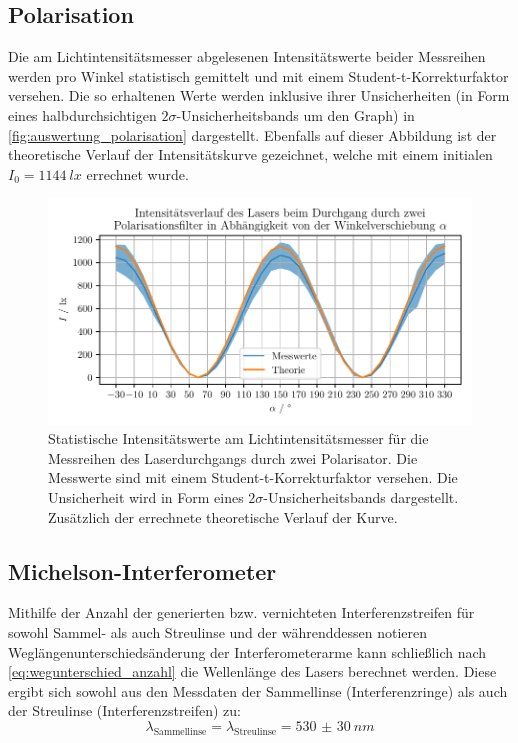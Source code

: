 \documentclass[ngerman]{scrartcl}
\begin{document}
\subsection{Polarisation}
\label{subsec:auswertung_polarisation}

Die am Lichtintensitätsmesser abgelesenen Intensitätswerte beider Messreihen werden pro Winkel statistisch gemittelt und mit einem Student-t-Korrekturfaktor versehen. Die so erhaltenen Werte werden inklusive ihrer Unsicherheiten (in Form eines halbdurchsichtigen $2 \sigma$-Unsicherheitsbands um den Graph) in \autoref{fig:auswertung_polarisation} dargestellt. Ebenfalls auf dieser Abbildung ist der theoretische Verlauf der Intensitätskurve gezeichnet, welche mit einem initialen $I_0 = \SI{1144}{lx}$ errechnet wurde.
%
\begin{figure}[H]
    \centering
    \begin{samepage}
        \includegraphics[width=\linewidth]{../python/plots/polarisation.pdf}
        \caption[Messkurve Polarisation]{Statistische Intensitätswerte am Lichtintensitätsmesser für die Messreihen des Laserdurchgangs durch zwei Polarisator. Die Messwerte sind mit einem Student-t-Korrekturfaktor versehen. Die Unsicherheit wird in Form eines $2 \sigma$-Unsicherheitsbands dargestellt. Zusätzlich der errechnete theoretische Verlauf der Kurve.}
        \label{fig:auswertung_polarisation}
    \end{samepage}
\end{figure}


\subsection{Michelson-Interferometer}
\label{subsec:auswertung_michelson}

Mithilfe der Anzahl der generierten bzw. vernichteten Interferenzstreifen für sowohl Sammel- als auch Streulinse und der währenddessen notieren Weglängenunterschiedsänderung der Interferometerarme kann schließlich nach \autoref{eq:wegunterschied_anzahl} die Wellenlänge des Lasers berechnet werden. Diese ergibt sich sowohl aus den Messdaten der Sammellinse (Interferenzringe) als auch der Streulinse (Interferenzstreifen) zu:
\[\lambda_{\text{Sammellinse}} = \lambda_{\text{Streulinse}} = \SI{530(30)}{nm}\]
\end{document}
